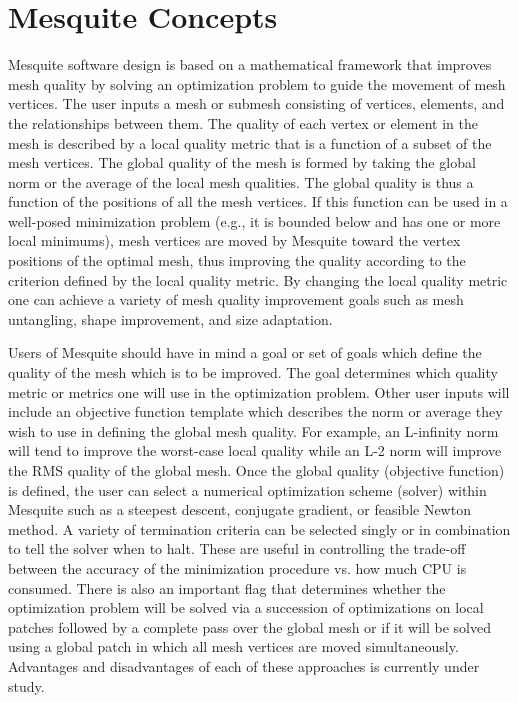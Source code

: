\section{Mesquite Concepts} \label{sec:concepts}

Mesquite software design is based on a mathematical 
framework that improves mesh quality by solving an optimization 
problem to guide the movement of mesh vertices. The user inputs a mesh or 
submesh consisting of vertices, elements, and the relationships between them. 
The quality of each vertex or 
element in the mesh is described by a local quality metric that is a function 
of a subset of the mesh vertices. The global quality of the mesh is formed by 
taking the global norm or the average of the local mesh qualities. The global 
quality is thus a function of the positions of all the mesh vertices. If this 
function can be used in a well-posed minimization problem (e.g., it is 
bounded below and has one or more local minimums), mesh vertices are moved 
by Mesquite toward the vertex positions of the optimal mesh, thus improving 
the quality according to the criterion defined by the local quality metric. 
By changing the local quality metric one can achieve a variety of mesh quality improvement goals such as mesh untangling, shape improvement, and size adaptation. \newline

Users of Mesquite should have in mind a goal or set of goals which define 
the quality of the mesh which is to be improved. The goal determines which
quality metric or metrics one will use in the optimization problem. Other 
user inputs will include an objective function template which describes 
the norm or average they wish to use in defining the global mesh quality. 
For example, an L-infinity norm will tend to improve the worst-case local 
quality while an L-2 norm will improve the RMS quality of the global mesh. 
Once the global quality (objective function) is defined, the user can 
select a numerical optimization scheme (solver) within Mesquite such as a 
steepest descent, conjugate gradient, or feasible Newton method. A variety of 
termination criteria can be selected singly or in combination to tell the 
solver when to halt. These are useful in controlling the trade-off between
the accuracy of the minimization procedure vs. how much CPU is consumed. 
There is also an important flag that determines whether the optimization 
problem will be solved via a succession of optimizations on local patches 
followed by a complete pass over the global mesh or if it will be solved using 
a global patch in which all mesh vertices are moved simultaneously. Advantages
and disadvantages of each of these approaches is currently under study.\newline

